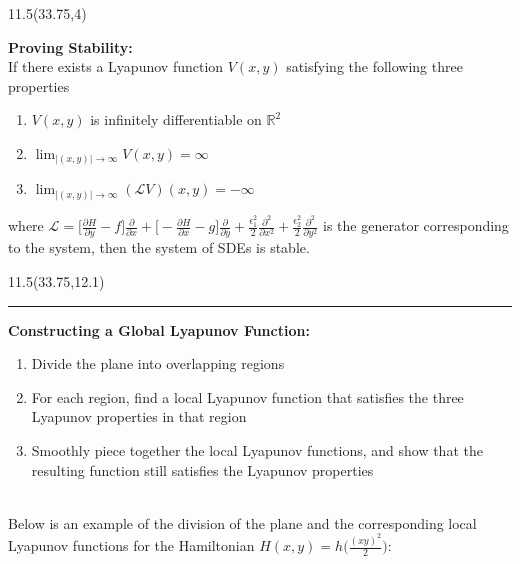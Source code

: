 \documentclass[a0]{a0poster}
\def\LHead#1{\colorbox{deepjunglegreen}{\noindent{\textbf{\Huge\color{white} #1}}\bigskip}}
\begin{document}



% 




\begin{textblock}{11.5}(33.75,4)
\medskip
\LHead{\parbox{11.5in}{\begin{center}Methods\end{center}}}\\  %
\large

\textbf{Proving Stability:}\\
If there exists a Lyapunov function $V(x,y)$ satisfying the following three properties
\begin{enumerate}
\item $V(x,y)$ is infinitely differentiable on $\mathbb{R}^2$
\item $\displaystyle\lim_{|(x,y)|\to\infty} V(x,y)=\infty$
\item $\displaystyle\lim_{|(x,y)|\to\infty} (\mathcal{L}V)(x,y)=-\infty$
\end{enumerate}
where $\mathcal{L}=\Big[\frac{\partial H}{\partial y}-f\Big]\frac{\partial}{\partial x}+\Big[-\frac{\partial H}{\partial x}-g\Big]\frac{\partial}{\partial y}+\frac{\epsilon_1^2}{2}\frac{\partial^2}{\partial x^2}+\frac{\epsilon_2^2}{2}\frac{\partial^2}{\partial y^2}$
is the generator corresponding to the system, then the system of SDEs is stable.\\

\qquad
\begin{textblock}{11.5}(33.75,12.1)
\hspace{0in}
\hrule
\end{textblock}


\textbf{Constructing a Global Lyapunov Function:}
\begin{enumerate}
\item Divide the plane into overlapping regions
\vspace{.25in}
\item For each region, find a local Lyapunov function that satisfies the three Lyapunov properties in that region
\vspace{.25in}
\item Smoothly piece together the local Lyapunov functions, and show that the resulting function still satisfies the Lyapunov properties
\end{enumerate}
\qquad\\
Below is an example of the division of the plane and the corresponding local Lyapunov functions for the Hamiltonian $H(x,y) = h\Big(\frac{(xy)^2}{2}\Big)$:
\end{textblock}
\end{document}
